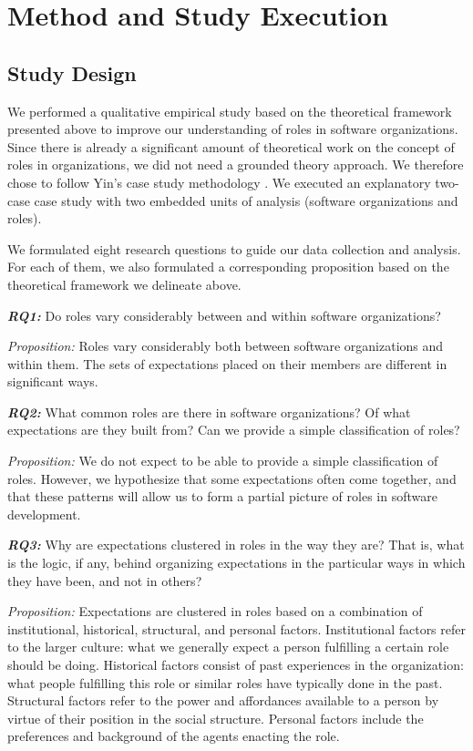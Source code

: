 \documentclass[10pt, conference, compsocconf]{IEEEtran}
\begin{document}



\section{Method and Study Execution}

\subsection{Study Design}

We performed a qualitative empirical study based on the theoretical framework presented above to improve our understanding of roles in software organizations. Since there is already a significant amount of theoretical work on the concept of roles in organizations, we did not need a grounded theory approach. We therefore chose to follow Yin's case study methodology \cite{Yin2003}. We executed an explanatory two-case case study with two embedded units of analysis (software organizations and roles).

We formulated eight research questions to guide our data collection and analysis. For each of them, we also formulated a corresponding proposition based on the theoretical framework we delineate above.

\textbf{\emph{RQ1:}} Do roles vary considerably between and within software organizations?

\emph{Proposition:} Roles vary considerably both between software organizations and within them. The sets of expectations placed on their members are different in significant ways.

\textbf{\emph{RQ2:}} What common roles are there in software organizations? Of what expectations are they built from? Can we provide a simple classification of roles?

\emph{Proposition:} We do not expect to be able to provide a simple classification of roles. However, we hypothesize that some expectations often come together, and that these patterns will allow us to form a partial picture of roles in software development.

\textbf{\emph{RQ3:}} Why are expectations clustered in roles in the way they are? That is, what is the logic, if any, behind organizing expectations in the particular ways in which they have been, and not in others?

\emph{Proposition:} Expectations are clustered in roles based on a combination of institutional, historical, structural, and personal factors. Institutional factors refer to the larger culture: what we generally expect a person fulfilling a certain role should be doing. Historical factors consist of past experiences in the organization: what people fulfilling this role or similar roles have typically done in the past. Structural factors refer to the power and affordances available to a person by virtue of their position in the social structure. Personal factors include the preferences and background of the agents enacting the role.
\end{document}
